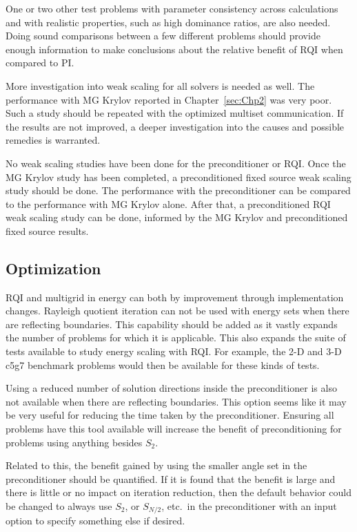 One or two other test problems with parameter consistency across calculations and with realistic properties, such as high dominance ratios, are also needed. Doing sound comparisons between a few different problems should provide enough information to make conclusions about the relative benefit of RQI when compared to PI.

More investigation into weak scaling for all solvers is needed as well. The performance with MG Krylov reported in Chapter~\ref{sec:Chp2} was very poor. Such a study should be repeated with the optimized multiset communication. If the results are not improved, a deeper investigation into the causes and possible remedies is warranted. 

No weak scaling studies have been done for the preconditioner or RQI. Once the MG Krylov study has been completed, a preconditioned fixed source weak scaling study should be done. The performance with the preconditioner can be compared to the performance with MG Krylov alone. After that, a preconditioned RQI weak scaling study can be done, informed by the MG Krylov and preconditioned fixed source results.

\subsection{Optimization}
RQI and multigrid in energy can both by improvement through implementation changes. Rayleigh quotient iteration can not be used with energy sets when there are reflecting boundaries. This capability should be added as it vastly expands the number of problems for which it is applicable. This also expands the suite of tests available to study energy scaling with RQI. For example, the 2-D and 3-D c5g7 benchmark problems would then be available for these kinds of tests. 

Using a reduced number of solution directions inside the preconditioner is also not available when there are reflecting boundaries. This option seems like it may be very useful for reducing the time taken by the preconditioner. Ensuring all problems have this tool available will increase the benefit of preconditioning for problems using anything besides $S_{2}$.

Related to this, the benefit gained by using the smaller angle set in the preconditioner should be quantified. If it is found that the benefit is large and there is little or no impact on iteration reduction, then the default behavior could be changed to always use $S_{2}$, or $S_{N/2}$, etc.\ in the preconditioner with an input option to specify something else if desired. 

